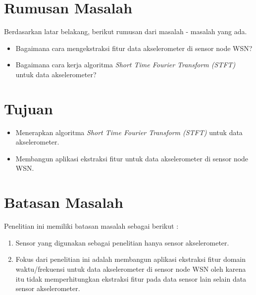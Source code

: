 \section{Rumusan Masalah}
\label{sec:rumusan}
Berdasarkan latar belakang, berikut rumusan dari masalah - masalah yang ada. 
\begin{itemize}
	\item Bagaimana cara mengekstraksi fitur data akselerometer di sensor node WSN? 
	\item Bagaimana cara kerja algoritma {\it Short Time Fourier Transform (STFT)} untuk data akselerometer?
\end{itemize}

\section{Tujuan}
\label{sec:tujuan}
\begin{itemize}
	\item Menerapkan algoritma {\it Short Time Fourier Transform (STFT)} untuk data akselerometer.
	\item Membangun aplikasi ekstraksi fitur untuk data akselerometer di sensor node WSN.
\end{itemize}

\section{Batasan Masalah}
\label{sec:batasan}
Penelitian ini memiliki batasan masalah sebagai berikut : 
\begin{enumerate}
	\item Sensor yang digunakan sebagai penelitian hanya sensor akselerometer.
	\item Fokus dari penelitian ini adalah membangun aplikasi ekstraksi fitur domain waktu/frekuensi untuk data akselerometer di sensor node WSN oleh karena itu tidak memperhitungkan ekstraksi fitur pada data sensor lain selain data sensor akselerometer.
\end{enumerate}

